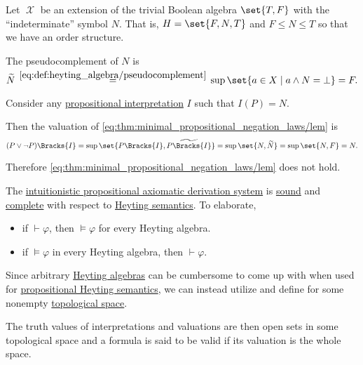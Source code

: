 \begin{example}\label{ex:heyting_semantics_lem_counterexample}
  Let \( \mscrX \) be an extension of the trivial Boolean algebra \( \set{ T, F } \) with the \enquote{indeterminate} symbol \( N \). That is, \( H = \set{ F, N, T } \) and \( F \leq N \leq T \) so that we have an order structure.

  The pseudocomplement of \( N \) is
  \begin{equation*}
    \widetilde{N}
    \reloset {\eqref{eq:def:heyting_algebra/pseudocomplement}} =
    \sup\set{ a \in X \given a \wedge N = \bot }
    =
    F.
  \end{equation*}

  Consider any \hyperref[def:propositional_valuation]{propositional interpretation} \( I \) such that \( I(P) = N \).

  Then the valuation of \eqref{eq:thm:minimal_propositional_negation_laws/lem} is
  \begin{equation*}
    (P \vee \neg P)\Bracks{I}
    =
    \sup\set{ P\Bracks{I}, \widetilde{P\Bracks{I}} }
    =
    \sup\set{ N, \widetilde{N} }
    =
    \sup\set{ N, F }
    =
    N.
  \end{equation*}

  Therefore \eqref{eq:thm:minimal_propositional_negation_laws/lem} does not hold.
\end{example}

\begin{theorem}\label{thm:intuitionistic_propositional_logic_is_sound_and_complete}
  The \hyperref[def:intuitionistic_propositional_axiomatic_derivation_system]{intuitionistic propositional axiomatic derivation system} is \hyperref[def:derivability_and_satisfiability/soundness]{sound} and \hyperref[def:derivability_and_satisfiability/completeness]{complete} with respect to \hyperref[def:propositional_heyting_algebra_semantics]{Heyting semantics}. To elaborate,
  \begin{itemize}
    \item if \( \vdash \varphi \), then \( \vDash \varphi \) for every Heyting algebra.
    \item if \( \vDash \varphi \) in every Heyting algebra, then \( \vdash \varphi \).
  \end{itemize}
\end{theorem}

\begin{definition}\label{def:propositional_topological_semantics}
  Since arbitrary \hyperref[def:heyting_algebra]{Heyting algebras} can be cumbersome to come up with when used for \hyperref[def:propositional_heyting_algebra_semantics]{propositional Heyting semantics}, we can instead utilize  and define  for some nonempty \hyperref[def:topological_space]{topological space}.

  The truth values of interpretations and valuations are then open sets in some topological space and a formula is said to be valid if its valuation is the whole space.
\end{definition}

